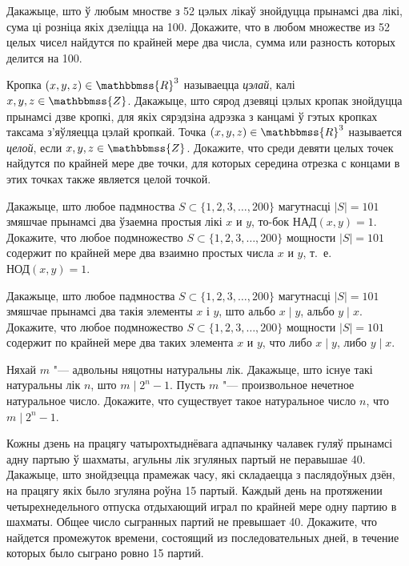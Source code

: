 




\begin{problemList}

\problemItemSimple
{Дакажыце, што ў любым мностве з 52 цэлых лікаў знойдуцца прынамсі два лікі, сума ці розніца якіх дзеліцца на 100.}
{Докажите, что в любом множестве из 52 целых чисел найдутся по крайней мере два числа, сумма или разность которых делится на 100.}

\bigskip

\problemItemSimple
{Кропка $(x, y, z) \in \mathbbmss{R}^3$ называецца \emph{цэлай}, калі $x, y, z \in \mathbbmss{Z}$. Дакажыце, што сярод дзевяці цэлых кропак знойдуцца прынамсі дзве кропкі, для якіх сярэдзіна адрэзка з канцамі ў гэтых кропках таксама з'яўляецца цэлай кропкай.}
{Точка $(x, y, z) \in \mathbbmss{R}^3$ называется \emph{целой}, если $x, y, z \in \mathbbmss{Z}$. Докажите, что среди девяти целых точек найдутся по крайней мере две точки, для которых середина отрезка с концами в этих точках также является целой точкой.}

\bigskip

\problemItemSimple
{Дакажыце, што любое падмноства $S \subset \{1, 2, 3, \ldots, 200\}$ магутнасці $|S| = 101$ змяшчае прынамсі два ўзаемна простыя лікі $x$ и $y$, то-бок $\text{НАД}(x, y) = 1$.}
{Докажите, что любое подмножество $S \subset \{1, 2, 3, \ldots, 200\}$ мощности $|S| = 101$ содержит по крайней мере два взаимно простых числа $x$ и $y$, т.~е. $\text{НОД}(x, y) = 1$.}

\bigskip

\problemItemSimple
{Дакажыце, што любое падмноства $S \subset \{1, 2, 3, \ldots, 200\}$ магутнасці $|S| = 101$ змяшчае прынамсі два такія элементы $x$ і $y$, што альбо $x \mid y$, альбо $y \mid x$.}
{Докажите, что любое подмножество $S \subset \{1, 2, 3, \ldots, 200\}$ мощности $|S| = 101$ содержит по крайней мере два таких элемента $x$ и $y$, что либо $x \mid y$, либо $y \mid x$.}

\bigskip

\problemItemSimple
{Няхай $m$ "--- адвольны няцотны натуральны лік. Дакажыце, што існуе такі натуральны лік $n$, што $m \mid 2^n - 1$.}
{Пусть $m$ "--- произвольное нечетное натуральное число. Докажите, что существует такое натуральное число $n$, что $m \mid 2^n - 1$.}

\bigskip

\problemItemSimple
{Кожны дзень на працягу чатырохтыднёвага адпачынку чалавек гуляў прынамсі адну партыю ў шахматы, агульны лік згуляных партый не перавышае 40. Дакажыце, што знойдзецца прамежак часу, які складаецца з паслядоўных дзён, на працягу якіх было згуляна роўна 15 партый.}
{Каждый день на протяжении четырехнедельного отпуска отдыхающий играл
по крайней мере одну партию в шахматы. Общее число сыгранных партий не
превышает 40. Докажите, что найдется промежуток времени, состоящий из
последовательных дней, в течение которых было сыграно ровно 15 партий.}

\end{problemList}


